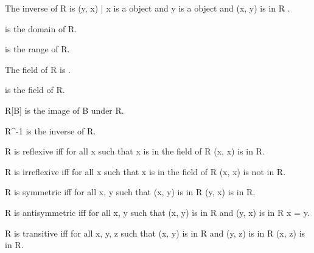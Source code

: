 \documentclass{article}
\begin{document}
\begin{forthel}
    \begin{definition} 
      The inverse of R is { (y, x) | x is a object and y is a object and (x, y) is in R }.
    \end{definition}

    \begin{definition} 
       is the domain of R.
    \end{definition}

    \begin{definition} 
       is the range of R.
    \end{definition}

    \begin{definition}
      The field of R is .
    \end{definition}

    \begin{definition} 
       is the field of R.
    \end{definition}

    \begin{definition} 
      R[B] is the image of B under R.
    \end{definition}

    \begin{definition} 
      R^{-1} is the inverse of R.
    \end{definition}

    \begin{definition}
      R is reflexive iff for all x such that x is in the field of R (x, x) is in R.
    \end{definition}

    \begin{definition}
      R is irreflexive iff for all x such that x is in the field of R (x, x) is not in R.
    \end{definition}

    \begin{definition}
      R is symmetric iff for all x, y such that (x, y) is in R (y, x) is in R.
    \end{definition}

    \begin{definition}
      R is antisymmetric iff for all x, y such that (x, y) is in R and (y, x) is in R x = y.
    \end{definition}

    \begin{definition}
      R is transitive iff for all x, y, z such that (x, y) is in R and (y, z) is in R (x, z) is in R.
    \end{definition}


\end{forthel}
\end{document}
